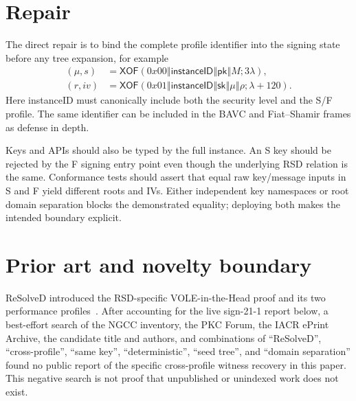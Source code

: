 \documentclass[11pt,a4paper]{article}
\newcommand{\concat}{\mathbin\Vert}
\newcommand{\pk}{\ensuremath{\mathsf{pk}}}
\newcommand{\sk}{\ensuremath{\mathsf{sk}}}
\begin{document}
\section{Repair}

The direct repair is to bind the complete profile identifier into the signing
state before any tree expansion, for example
\begin{align}
 (\mu,s)&=\mathsf{XOF}(0x00\concat\mathsf{instanceID}\concat\pk\concat M;
                       3\lambda),\nonumber\\
 (r,iv)&=\mathsf{XOF}(0x01\concat\mathsf{instanceID}\concat\sk\concat\mu
                       \concat\rho;\lambda+120).               \label{eq:repair}
\end{align}
Here \textsf{instanceID} must canonically include both the security level and
the S/F profile.  The same identifier can be included in the BAVC and
Fiat--Shamir frames as defense in depth.

Keys and APIs should also be typed by the full instance.  An S key should be
rejected by the F signing entry point even though the underlying RSD relation is
the same.  Conformance tests should assert that equal raw key/message inputs in
S and F yield different roots and IVs.  Either independent key namespaces or
root domain separation blocks the demonstrated equality; deploying both makes
the intended boundary explicit.

\section{Prior art and novelty boundary}

ReSolveD introduced the RSD-specific VOLE-in-the-Head proof and its two
performance profiles~\cite{resolved-paper}.  After accounting for the live
sign-21-1 report below, a best-effort search of the NGCC inventory, the PKC
Forum, the IACR ePrint Archive, the candidate title and authors, and combinations
of ``ReSolveD'', ``cross-profile'', ``same key'', ``deterministic'', ``seed
tree'', and ``domain separation'' found no public report of the specific
cross-profile witness recovery in this paper.  This negative search is not proof
that unpublished or unindexed work does not exist.
\end{document}
